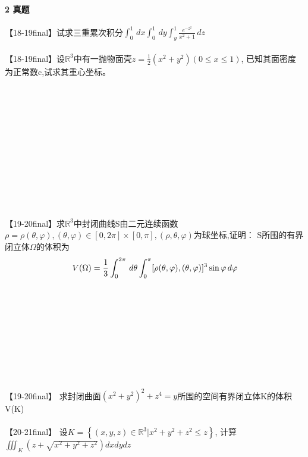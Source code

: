 \documentclass[12pt]{scrartcl}
\begin{document}
{\paragraph*{\large 2 真题}\leavevmode \newline
【18-19final】试求三重累次积分$\int_{0}^{1}  \,dx\int_{0}^{1}  \,dy\int_{y}^{1} \frac{e^{-z^2}}{x^2+1} \,dz $
\\
\\
\newpage
【18-19final】设$\mathbb{R} ^3$中有一抛物面壳$z=\frac{1}{2}(x^2+y^2)(0\leq x \leq 1)$,
已知其面密度为正常数c,试求其重心坐标。
\\
\\
\\
\\
\\
\\
\\
\\
\\
\\
\\
\\
\\
【19-20final】求$\mathbb{R} ^3$中封闭曲线S由二元连续函数$\rho=\rho(\theta,\varphi ),(\theta,\varphi )\in[0,2\pi]\times[0,\pi] ,(\rho,\theta,\varphi)$为球坐标,证明：
S所围的有界闭立体$\Omega $的体积为
\begin{align}
    V(\Omega)=\frac{1}{3}\int_{0}^{2\pi}  \,d\theta\int_{0}^{\pi}[\rho(\theta,\varphi ),(\theta,\varphi)]^3\sin \varphi  \,d\varphi \notag  
\end{align}
\\
\\
\\
\\
\\
\\
\\
\\
\\
【19-20final】 求封闭曲面$(x^2+y^2)^2+z^4=y$所围的空间有界闭立体K的体积V(K)  
\\
\\
\newpage
【20-21final】 设$K=\left\{(x,y,z)\in \mathbb{R} ^3|x^2+y^2+z^2\leq z\right\} $,
计算$ \iiint_K(z+\sqrt{x^2+y^2+z^2}) dxdydz $
\\
\\
\\
\\
\\
\\
\\
\\

}
\end{document}

